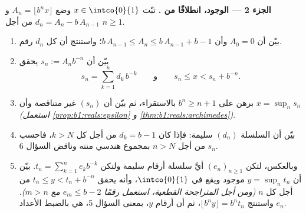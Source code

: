 \begin{problem}
\medskip
\noindent\textbf{الجزء 2 --- الوجود، انطلاقًا من .} ثبّت
$x \in \intco{0}{1}$ وضع $A_n = \lfloor b^n x \rfloor$ و
$d_n = A_n - b\,A_{n-1}$ من أجل $n \geq 1$.
\begin{enumerate}[resume]
  \item بيّن أن $A_0 = 0$ وأن $b\,A_{n-1} \leq A_n \leq b\,A_{n-1} +
        b - 1$؛ واستنتج أن كل $d_n$ رقم.
  \item بيّن أن $s_n := A_n b^{-n}$ يحقق
        \[
        s_n = \sum_{k=1}^{n} d_k\,b^{-k}
        \qquad\text{و}\qquad
        s_n \leq x < s_n + b^{-n} .
        \]
  \item برهن على $b^n \geq n + 1$ بالاستقراء، ثم بيّن أن
        $(s_n)$ غير متناقصة وأن $x = \sup_n s_n$
        \emph{(استعمل \cref{prop:b1:reals:epsilon} و
        \cref{thm:b1:reals:archimedes})}.
  \item بيّن أن السلسلة $(d_n)$ سليمة: فإذا كان $d_k = b - 1$
        من أجل كل $k > N$، فاحسب $s_n$ من أجل $n > N$ بمجموع
        هندسي منته وناقض السؤال 6.
  \item وبالعكس، لتكن $(e_n)_{n \geq 1}$ أيَّ سلسلة أرقام
        سليمة ولتكن $t_n = \sum_{k=1}^n e_k b^{-k}$. بيّن أن $y
        = \sup_n t_n$ موجود ويقع في $\intco{0}{1}$،
        وأنه يحقق $t_n \leq y < t_n + b^{-n}$ من أجل كل $n$
        \emph{(ومن أجل المتراجحة القطعية، استعمل رقمًا $e_m \leq b
        - 2$ مع $m > n$)}. واستنتج $\lfloor b^n y \rfloor = b^n
        t_n$، ثم أن أرقام $y$، بمعنى
        السؤال 5، هي بالضبط الأعداد $e_n$.
\end{enumerate}


\end{problem}
